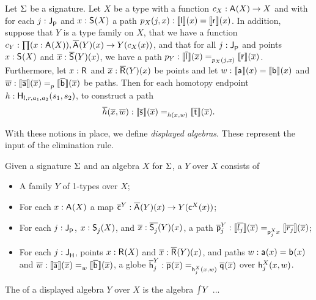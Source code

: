 \begin{problem}
\label{prob:homot_dact}
Let $\sign$ be a signature.
Let $X$ be a type with a function $c_X : \polyAct{\pointconstr}{X} \rightarrow X$
and with for each $j : \pathlabel$ and $x : \polyAct{\patharg}{X}$ a path $p_X(j, x) : \semE{\pathleft}(x) = \semE{\pathright}(x)$.
In addition, suppose that $Y$ is a type family on $X$,
that we have a function $c_Y : \depprod{(x : \polyAct{\pointconstr}{X})}{\polyDact{\pointconstr}{Y}(x) \rightarrow Y(c_X(x))}$,
and that for all $j  : \pathlabel$ and points $x : \polyAct{\patharg}{X}$ and $\xx : \polyDact{\patharg}{Y}(x)$,
we have a path $p_Y : \pathover{p_X(j, x)}{\pathendpointDact{\pathleft}{\xx}}{\pathendpointDact{\pathright}{\xx}}$.
Furthermore, let $x : \homotpointarg$ and $\xx : \polyDact{\homotpointarg}{Y}(x)$ be points
and let $w : \semE{\pathargleft}(x) = \semE{\pathargright}(x)$
and $\disp{w} : \pathover{p}{\pathendpointDact{\pathargleft}{\xx}}{\pathendpointDact{\pathargright}{\xx}}$
be paths.
Then for each homotopy endpoint $h : \homotendpoint{l}{r}{a_1}{a_2}{s_1}{s_2}$, 
to construct a path
\[
\homotendpointDact{h}{\xx, \disp{w}} : \pathover{\homotendpointAct{h}{x, w}}{\pathendpointDact{\homotpathleft}{\xx}}{\pathendpointDact{\homotpathright}{\xx}}.
\]
\end{problem}

With these notions in place, we define \emph{displayed algebras}.
These represent the input of the elimination rule.

\begin{definition}\label{def:disp_alg}
Given a signature $\sign$ and an algebra $X$ for $\sign$,
a  $Y$ over $X$ consists of
\begin{itemize}
	\item A family $Y$ of 1-types over $X$;
	\item For each $x : \polyAct{\pointconstr}{X}$ a map $\DispAlgPoint{Y} : \polyDact{\pointconstr}{Y}(x) \rightarrow Y(\AlgPoint{X}(x))$;
	\item For each $j : \pathlabel$, $x : \polyAct{\patharg_j}{X}$, and $\pover{x} : \polyDact{\patharg_j}{Y}(x)$, a path
	$
	\DispAlgPath{Y}{j} : \pathover{\AlgPath{X}{j}{x}}{\pathendpointDact{l_j}{\pover{x}}}{\pathendpointDact{r_j}{\pover{x}}}
	$;
	\item For each $j : \homotlabel$, points $x : \polyAct{\homotpointarg}{X}$ and $\pover{x} : \polyDact{\homotpointarg}{Y}(x)$,
	and paths $w : \pathargleft(x) = \pathargright(x)$ and $\pover{w} : \pathover{w}{\pathendpointDact{\pathargleft}{\pover{x}}}{\pathendpointDact{\pathargright}{\pover{x}}}$,
	a globe
	$
	\DispAlgHomot{Y}{j} : \globeover{\AlgHomot{X}{j}{(x, w)}}{\homotendpointDact{\homotleft}{\xx}}{\homotendpointDact{\homotright}{\xx}}
	$
	over $\AlgHomot{X}{j}{(x, w)}$.
\end{itemize}
The  of a displayed algebra $Y$ over $X$ is the algebra $\TotalAlg Y$ ...
\end{definition}

